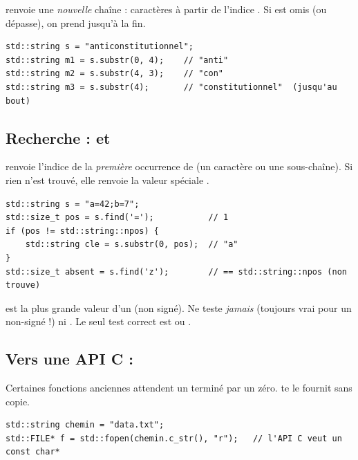 \documentclass[11pt]{article}
\begin{document}
 renvoie une \emph{nouvelle} chaîne : 
caractères à partir de l'indice . Si  est omis (ou dépasse),
on prend jusqu'à la fin.

\begin{lstlisting}
std::string s = "anticonstitutionnel";
std::string m1 = s.substr(0, 4);    // "anti"
std::string m2 = s.substr(4, 3);    // "con"
std::string m3 = s.substr(4);       // "constitutionnel"  (jusqu'au bout)
\end{lstlisting}

\subsection*{Recherche :  et }

 renvoie l'indice de la \emph{première} occurrence de 
(un caractère ou une sous-chaîne). Si rien n'est trouvé, elle renvoie la valeur
spéciale .

\begin{lstlisting}
std::string s = "a=42;b=7";
std::size_t pos = s.find('=');           // 1
if (pos != std::string::npos) {
    std::string cle = s.substr(0, pos);  // "a"
}
std::size_t absent = s.find('z');        // == std::string::npos (non trouve)
\end{lstlisting}

\begin{piege}
 est la plus grande valeur d'un 
(non signé). Ne teste \emph{jamais}  (toujours vrai pour un
non-signé !) ni . Le seul test correct est
 ou .
\end{piege}

\subsection*{Vers une API C : }

Certaines fonctions anciennes attendent un  terminé par un
zéro.  te le fournit sans copie.

\begin{lstlisting}
std::string chemin = "data.txt";
std::FILE* f = std::fopen(chemin.c_str(), "r");   // l'API C veut un const char*
\end{lstlisting}
\end{document}
